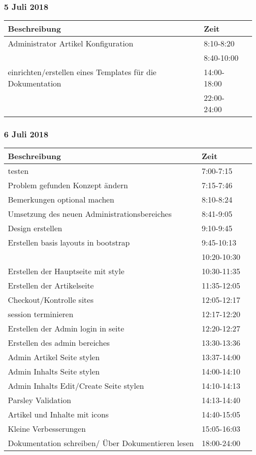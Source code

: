 \documentclass[a4paper, 11pt]{article}
\begin{document}
\subsubsection{5 Juli 2018}

\begin{tabular}{llr}
\toprule
Beschreibung & Zeit \\
\midrule
Administrator Artikel Konfiguration & 8:10-8:20 \\
 & 8:40-10:00 \\
einrichten/erstellen eines Templates für die Dokumentation & 14:00-18:00 \\
 & 22:00-24:00 \\
\bottomrule
\end{tabular}

\subsubsection{6 Juli 2018}

\begin{tabular}{llr}
\toprule
Beschreibung & Zeit \\
\midrule
testen & 7:00-7:15 \\
Problem gefunden Konzept ändern & 7:15-7:46 \\
Bemerkungen optional machen & 8:10-8:24 \\
Umsetzung des neuen Administrationsbereiches & 8:41-9:05 \\
Design erstellen & 9:10-9:45 \\
Erstellen basis layouts in bootstrap & 9:45-10:13 \\
 & 10:20-10:30 \\
Erstellen der Hauptseite mit style & 10:30-11:35 \\
Erstellen der Artikelseite & 11:35-12:05 \\
Checkout/Kontrolle sites & 12:05-12:17 \\
session terminieren & 12:17-12:20 \\
Erstellen der Admin login in seite & 12:20-12:27 \\
Erstellen des admin bereiches & 13:30-13:36 \\
Admin Artikel Seite stylen & 13:37-14:00 \\
Admin Inhalts Seite stylen & 14:00-14:10 \\
Admin Inhalts Edit/Create Seite stylen & 14:10-14:13 \\
Parsley Validation & 14:13-14:40 \\
Artikel und Inhalte mit icons & 14:40-15:05 \\
Kleine Verbesserungen & 15:05-16:03 \\
Dokumentation schreiben/ Über Dokumentieren lesen & 18:00-24:00 \\
\bottomrule
\end{tabular}
\end{document}
